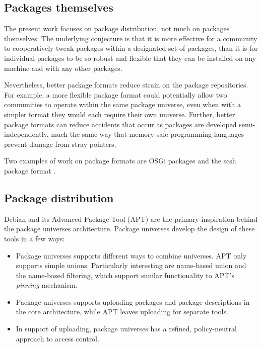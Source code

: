 \documentclass{article}
\begin{document}
\subsection{Packages themselves}
The present work focuses on package distribution, not much on packages
themselves.  The underlying conjecture is that it is more effective
for a community to cooperatively tweak packages within a designated
set of packages, than it is for individual packages to be so robust
and flexible that they can be installed on any machine and with any
other packages.


Nevertheless, better package formats reduce strain on the package
repositories.  For example, a more flexible package format could
potentially allow two communities to operate within the same package
universe, even when with a simpler format they would each require
their own universe.  Further, better package formats can reduce
accidents that occur as packages are developed semi-independently,
much the same way that memory-safe programming languages prevent
damage from stray pointers.

Two examples of work on package formats are OSGi packages
\cite{osgi03:book, osgi:web} and the scsh package format
\cite{schinz05:scsh}.


\subsection{Package distribution}




Debian and its Advanced Package Tool (APT) \cite{apt:howto}
are the primary inspiration behind the package universes architecture.
Package universes develop the design of these tools in a few ways:
\begin{itemize}
\item Package universes supports different ways to combine universes.
      APT only supports simple unions.  Particularly interesting are
      name-based union and the name-based filtering, which support
      similar functionality to APT's \emph{pinning} mechanism.

\item Package universes supports uploading packages and package
      descriptions in the core architecture, while APT leaves
      uploading for separate tools.

\item In support of uploading, package universes has a refined,
      policy-neutral approach to access control.
\end{itemize}
\end{document}
